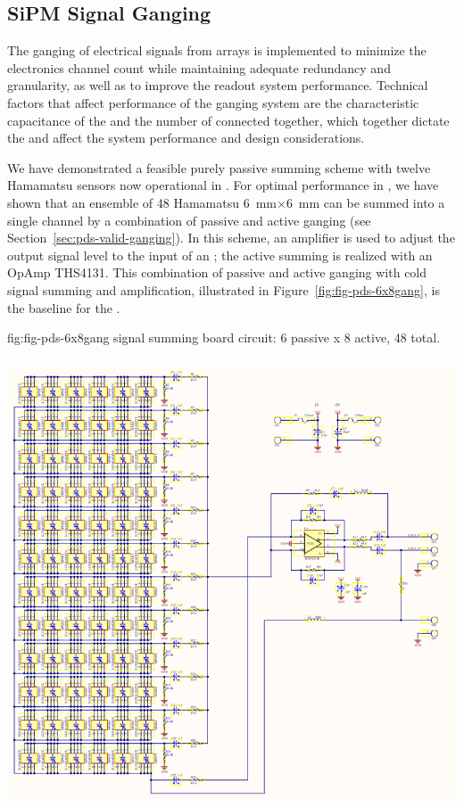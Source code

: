 \subsection{SiPM Signal Ganging}
\label{sec:pds-design-ganging}

The ganging of electrical signals from  arrays is implemented to minimize the electronics channel count while maintaining adequate redundancy and granularity, as well as to improve the readout system performance.  
Technical factors that affect performance of the ganging system are the characteristic capacitance of the  and the number of  connected together, which together dictate the  and affect the system performance and design considerations.

We have demonstrated a feasible purely passive summing scheme with twelve Hamamatsu  sensors now operational in . For optimal performance in , we have shown that an ensemble of 48 Hamamatsu \SI{6}{mm}$\times$\SI{6}{mm}  can be summed into a single channel by a combination of passive and active ganging (see Section~\ref{sec:pds-valid-ganging}).  In this scheme, an amplifier is used to adjust the  output signal level to the input of an ; the active summing is realized with an OpAmp THS4131. This combination of passive and active ganging with cold signal summing and amplification, illustrated in Figure~\ref{fig:fig-pds-6x8gang}, is the baseline for the .

\begin{dunefigure}
 {fig:fig-pds-6x8gang}
 { signal summing board circuit: 6 passive  x 8 active, 48  total.}
\includegraphics[height=14cm]{graphics/pds_gang_fig2.png}
\end{dunefigure}

